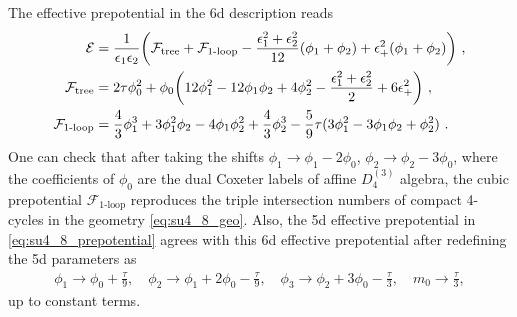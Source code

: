 The effective prepotential in the 6d description reads
\begin{align}
\mathcal{E} &= \frac{1}{\epsilon_1 \epsilon_2} \qty( \mathcal{F}_{\mathrm{tree}} + \mathcal{F}_{\text{1-loop}} - \frac{\epsilon_1^2 + \epsilon_2^2}{12}(\phi_1 + \phi_2) + \epsilon_+^2 (\phi_1 + \phi_2 ) )\ , \nonumber \\
\mathcal{F}_{\mathrm{tree}} &= 2\tau \phi_0^2 + \phi_0 \qty(12\phi_1^2 - 12\phi_1 \phi_2 + 4\phi_2^2 -\frac{\epsilon_1^2 + \epsilon_2^2}{2} + 6\epsilon_+^2)\ , \nonumber \\
\mathcal{F}_{\text{1-loop}} &= \frac{4}{3}\phi_1^3 + 3\phi_1^2 \phi_2 - 4\phi_1 \phi_2^2 + \frac{4}{3}\phi_2^3 - \frac{5}{9}\tau (3\phi_1^2 - 3\phi_1 \phi_2 + \phi_2^2) \ . \label{eq:1-loopSO8Aut}
\end{align}
One can check that after taking the shifts $ \phi_1 \to \phi_1 - 2\phi_0 $, $ \phi_2 \to \phi_2 - 3\phi_0 $, where the coefficients of $ \phi_0 $ are the dual Coxeter labels of affine $ D_4^{(3)} $ algebra, the cubic prepotential $\mathcal{F}_{\text{1-loop}}$ reproduces the triple intersection numbers of compact 4-cycles in the geometry \eqref{eq:su4_8_geo}. Also, the 5d effective prepotential in \eqref{eq:su4_8_prepotential} agrees with this 6d effective prepotential after redefining the 5d parameters as 
\begin{align}
\phi_1 \to \phi_0 + \frac{\tau}{9}, \quad
\phi_2 \to \phi_1 + 2\phi_0 - \frac{\tau}{9}, \quad
\phi_3 \to \phi_2 + 3\phi_0 - \frac{\tau}{3}, \quad
m_0 \to \frac{\tau}{3},
\end{align}
up to constant terms.

